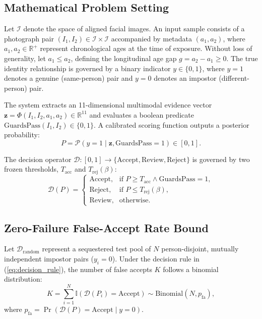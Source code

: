 \documentclass[10pt,journal,compsoc]{IEEEtran}
\newcommand{\vect}[1]{\mathbf{#1}}
\begin{document}
\subsection{Mathematical Problem Setting}
Let $\mathcal{I}$ denote the space of aligned facial images. An input sample consists of a photograph pair $(I_1, I_2) \in \mathcal{I} \times \mathcal{I}$ accompanied by metadata $(a_1, a_2)$, where $a_1, a_2 \in \mathbb{R}^+$ represent chronological ages at the time of exposure. Without loss of generality, let $a_1 \le a_2$, defining the longitudinal age gap $g = a_2 - a_1 \ge 0$. The true identity relationship is governed by a binary indicator $y \in \{0, 1\}$, where $y=1$ denotes a genuine (same-person) pair and $y=0$ denotes an impostor (different-person) pair.

The system extracts an 11-dimensional multimodal evidence vector $\vect{z} = \Phi(I_1, I_2, a_1, a_2) \in \mathbb{R}^{11}$ and evaluates a boolean predicate $\text{GuardsPass}(I_1, I_2) \in \{0, 1\}$. A calibrated scoring function outputs a posterior probability:
\begin{equation}
P = \mathcal{P}(y = 1 \mid \vect{z}, \text{GuardsPass} = 1) \in [0, 1].
\end{equation}

The decision operator $\mathcal{D}: [0, 1] \to \{\text{Accept}, \text{Review}, \text{Reject}\}$ is governed by two frozen thresholds, $T_{\text{acc}}$ and $T_{\text{rej}}(\beta)$:
\begin{equation}
\label{eq:decision_rule}
\mathcal{D}(P) = \begin{cases}
\text{Accept}, & \text{if } P \ge T_{\text{acc}} \land \text{GuardsPass} = 1, \\
\text{Reject}, & \text{if } P \le T_{\text{rej}}(\beta), \\
\text{Review}, & \text{otherwise}.
\end{cases}
\end{equation}

\subsection{Zero-Failure False-Accept Rate Bound}
\label{sec:bound_derivation}
Let $\mathcal{D}_{\text{random}}$ represent a sequestered test pool of $N$ person-disjoint, mutually independent impostor pairs ($y_i = 0$). Under the decision rule in (\ref{eq:decision_rule}), the number of false accepts $K$ follows a binomial distribution:
\begin{equation}
K = \sum_{i=1}^N \mathbb{I}(\mathcal{D}(P_i) = \text{Accept}) \sim \text{Binomial}(N, p_{\text{fa}}),
\end{equation}
where $p_{\text{fa}} = \Pr(\mathcal{D}(P) = \text{Accept} \mid y = 0)$.
\end{document}
